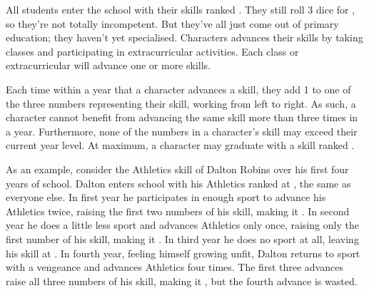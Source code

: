 All students enter the school with their skills ranked .
They still roll 3 dice for {\tests}, so they're not totally incompetent.
But they've all just come out of primary education; they haven't yet specialised.
Characters advances their skills by taking classes and participating in extracurricular activities.
Each class or extracurricular will advance one or more skills.

Each time within a year that a character advances a skill, they add 1 to one of the three numbers representing their skill, working from left to right.
As such, a character cannot benefit from advancing the same skill more than three times in a year.
Furthermore, none of the numbers in a character's skill may exceed their current year level.
At maximum, a character may graduate with a skill ranked .

As an example, consider the Athletics skill of Dalton Robins over his first four years of school.
Dalton enters school with his Athletics ranked at , the same as everyone else.
In first year he participates in enough sport to advance his Athletics twice, raising the first two numbers of his skill, making it .
In second year he does a little less sport and advances Athletics only once, raising only the first number of his skill, making it .
In third year he does no sport at all, leaving his skill at .
In fourth year, feeling himself growing unfit, Dalton returns to sport with a vengeance and advances Athletics four times.
The first three advances raise all three numbers of his skill, making it , but the fourth advance is wasted.
